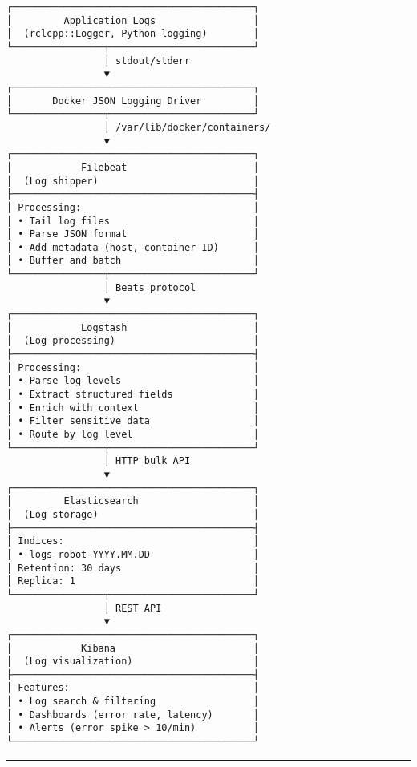 \documentclass[
]{article}
\begin{document}
\begin{verbatim}
┌──────────────────────────────────────────┐
│         Application Logs                 │
│  (rclcpp::Logger, Python logging)        │
└────────────────┬─────────────────────────┘
                 │ stdout/stderr
                 ▼
┌──────────────────────────────────────────┐
│       Docker JSON Logging Driver         │
└────────────────┬─────────────────────────┘
                 │ /var/lib/docker/containers/
                 ▼
┌──────────────────────────────────────────┐
│            Filebeat                      │
│  (Log shipper)                           │
├──────────────────────────────────────────┤
│ Processing:                              │
│ • Tail log files                         │
│ • Parse JSON format                      │
│ • Add metadata (host, container ID)      │
│ • Buffer and batch                       │
└────────────────┬─────────────────────────┘
                 │ Beats protocol
                 ▼
┌──────────────────────────────────────────┐
│            Logstash                      │
│  (Log processing)                        │
├──────────────────────────────────────────┤
│ Processing:                              │
│ • Parse log levels                       │
│ • Extract structured fields              │
│ • Enrich with context                    │
│ • Filter sensitive data                  │
│ • Route by log level                     │
└────────────────┬─────────────────────────┘
                 │ HTTP bulk API
                 ▼
┌──────────────────────────────────────────┐
│         Elasticsearch                    │
│  (Log storage)                           │
├──────────────────────────────────────────┤
│ Indices:                                 │
│ • logs-robot-YYYY.MM.DD                  │
│ Retention: 30 days                       │
│ Replica: 1                               │
└────────────────┬─────────────────────────┘
                 │ REST API
                 ▼
┌──────────────────────────────────────────┐
│            Kibana                        │
│  (Log visualization)                     │
├──────────────────────────────────────────┤
│ Features:                                │
│ • Log search & filtering                 │
│ • Dashboards (error rate, latency)       │
│ • Alerts (error spike > 10/min)          │
└──────────────────────────────────────────┘
\end{verbatim}

\begin{center}\rule{0.5\linewidth}{0.5pt}\end{center}
\end{document}

